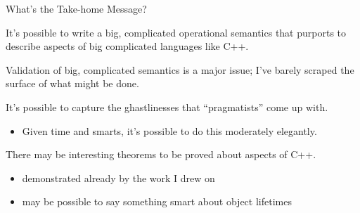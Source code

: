\documentclass[compress,dvips,color=usenames,xcolor=dvipsnames]{beamer}
\newcommand{\cpp}{\mbox{C\hspace{-.1em}+\hspace{-.05em}+}}
\begin{document}
\begin{frame}{What's the Take-home Message?}

It's possible to write a big, complicated operational semantics that
purports to describe aspects of big complicated languages like \cpp{}.

\bigskip
Validation of big, complicated semantics is a major issue; I've barely
scraped the surface of what might be done.

\bigskip
It's possible to capture the ghastlinesses that ``pragmatists'' come
up with.  
\begin{itemize}
\item Given time and smarts, it's possible to do this moderately
elegantly. 
\end{itemize}

\bigskip
There may be interesting theorems to be proved about aspects of
\cpp{}. 
\begin{itemize}
\item demonstrated already by the work I drew on
\item may be possible to say something smart about object lifetimes
\end{itemize}
  

\end{frame}
\end{document}
